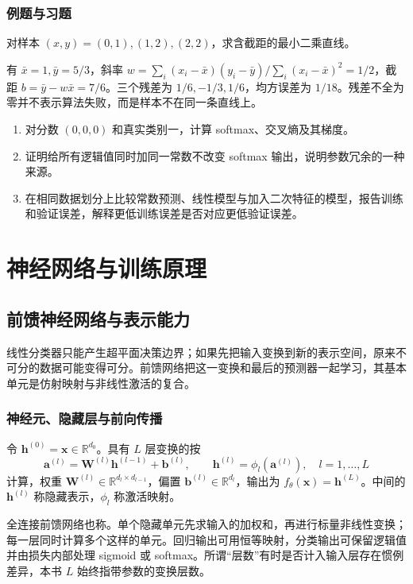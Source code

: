 \documentclass[UTF8,12pt,a4paper,fontset=fandol]{ctexbook}
\begin{document}
\section{例题与习题}
\begin{example}[拟合一条直线]
对样本 $(x,y)=(0,1),(1,2),(2,2)$，求含截距的最小二乘直线。
\end{example}
\begin{solve}
有 $\bar x=1,\bar y=5/3$，斜率 $w=\sum_i(x_i-\bar x)(y_i-\bar y)/\sum_i(x_i-\bar x)^2=1/2$，截距 $b=\bar y-w\bar x=7/6$。三个残差为 $1/6,-1/3,1/6$，均方误差为 $1/18$。残差不全为零并不表示算法失败，而是样本不在同一条直线上。
\end{solve}
\begin{enumerate}
\item 对分数 $(0,0,0)$ 和真实类别一，计算 softmax、交叉熵及其梯度。
\item 证明给所有逻辑值同时加同一常数不改变 softmax 输出，说明参数冗余的一种来源。
\item 在相同数据划分上比较常数预测、线性模型与加入二次特征的模型，报告训练和验证误差，解释更低训练误差是否对应更低验证误差。
\end{enumerate}

\part{神经网络与训练原理}

\chapter{前馈神经网络与表示能力}
\label{chap:dl-mlp}
线性分类器只能产生超平面决策边界；如果先把输入变换到新的表示空间，原来不可分的数据可能变得可分。前馈网络把这一变换和最后的预测器一起学习，其基本单元是仿射映射与非线性激活的复合。

\section{神经元、隐藏层与前向传播}
\begin{definition}[前馈网络]
令 $\mathbf h^{(0)}=\mathbf x\in\mathbb R^{d_0}$。具有 $L$ 层变换的按
\begin{equation}
\mathbf a^{(l)}=\mathbf W^{(l)}\mathbf h^{(l-1)}+\mathbf b^{(l)},\qquad
\mathbf h^{(l)}=\phi_l(\mathbf a^{(l)}),\quad l=1,\ldots,L
\label{eq:dl-forward-layer}
\end{equation}
计算，权重 $\mathbf W^{(l)}\in\mathbb R^{d_l\times d_{l-1}}$，偏置 $\mathbf b^{(l)}\in\mathbb R^{d_l}$，输出为 $f_\theta(\mathbf x)=\mathbf h^{(L)}$。中间的 $\mathbf h^{(l)}$ 称隐藏表示，$\phi_l$ 称激活映射。
\end{definition}
全连接前馈网络也称。单个隐藏单元先求输入的加权和，再进行标量非线性变换；每一层同时计算多个这样的单元。回归输出可用恒等映射，分类输出可保留逻辑值并由损失内部处理 sigmoid 或 softmax。所谓“层数”有时是否计入输入层存在惯例差异，本书 $L$ 始终指带参数的变换层数。
\end{document}
